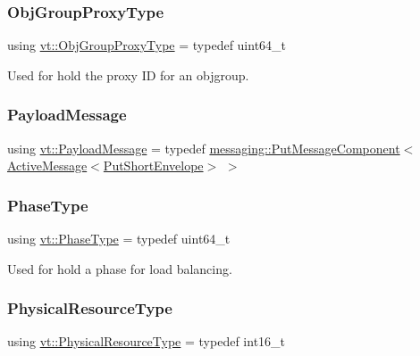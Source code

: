 \subsubsection{\texorpdfstring{Obj\+Group\+Proxy\+Type}{ObjGroupProxyType}}
{\footnotesize\ttfamily using \hyperlink{namespacevt_ad7cae989df485fccca57f0792a880a8e}{vt\+::\+Obj\+Group\+Proxy\+Type} = typedef uint64\+\_\+t}



Used for hold the proxy ID for an objgroup. 

\mbox{\label{namespacevt_a89a92229c5622b855c02c549f83a1a68}} 
\subsubsection{\texorpdfstring{Payload\+Message}{PayloadMessage}}
{\footnotesize\ttfamily using \hyperlink{namespacevt_a89a92229c5622b855c02c549f83a1a68}{vt\+::\+Payload\+Message} = typedef \hyperlink{structvt_1_1messaging_1_1_put_message_component}{messaging\+::\+Put\+Message\+Component}$<$ \hyperlink{namespacevt_a00eb67bd138395b6a4f744fab3fa0678}{Active\+Message}$<$\hyperlink{namespacevt_a8d7a7de9e76bfea1600009a775b7298c}{Put\+Short\+Envelope}$>$ $>$}

\mbox{\label{namespacevt_a46ce6733d5cdbd735d561b7b4029f6d7}} 
\subsubsection{\texorpdfstring{Phase\+Type}{PhaseType}}
{\footnotesize\ttfamily using \hyperlink{namespacevt_a46ce6733d5cdbd735d561b7b4029f6d7}{vt\+::\+Phase\+Type} = typedef uint64\+\_\+t}



Used for hold a phase for load balancing. 

\mbox{\label{namespacevt_a2dc36fcada816dc6d11774d650328ee9}} 
\subsubsection{\texorpdfstring{Physical\+Resource\+Type}{PhysicalResourceType}}
{\footnotesize\ttfamily using \hyperlink{namespacevt_a2dc36fcada816dc6d11774d650328ee9}{vt\+::\+Physical\+Resource\+Type} = typedef int16\+\_\+t}

